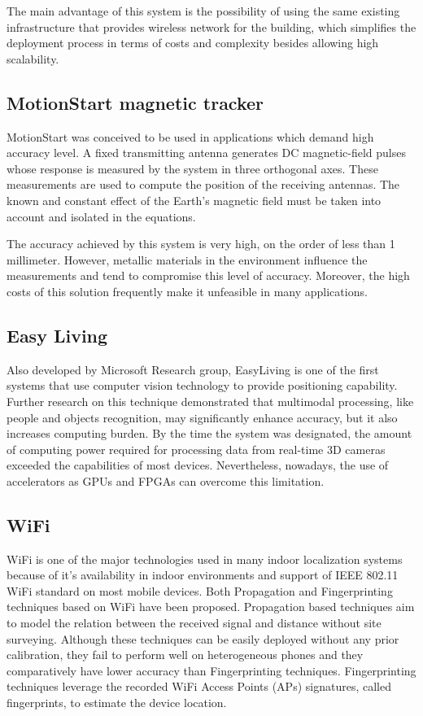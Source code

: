 The main advantage of this system is the possibility of using the same existing infrastructure that provides wireless network for the building, which simplifies the deployment process in terms of costs and complexity besides allowing high scalability.

\subsection{MotionStart magnetic tracker}
MotionStart \cite{motionStart} was conceived to be used in applications which demand high accuracy level. A fixed transmitting antenna generates DC magnetic-field pulses whose response is measured by the system in three orthogonal axes. These measurements are used to compute the position of the receiving antennas. The known and constant effect of the Earth's magnetic field must be taken into account and isolated in the equations.

The accuracy achieved by this system is very high, on the order of less than 1 millimeter. However, metallic materials in the environment influence the measurements and tend to compromise this level of accuracy. Moreover, the high costs of this solution frequently make it unfeasible in many applications.

\subsection{Easy Living}
Also developed by Microsoft Research group, EasyLiving \cite{easyLiving} is one of the first systems that use computer vision technology to provide positioning capability. Further research on this technique demonstrated that multimodal processing, like people and objects recognition, may significantly enhance accuracy, but it also increases computing burden. By the time the system was designated, the amount of computing power required for processing data from real-time 3D cameras exceeded the capabilities of most devices. Nevertheless, nowadays, the use of accelerators as GPUs and FPGAs can overcome this limitation.

\subsection{WiFi} 
WiFi is one of the major technologies used in many indoor localization systems because of it's availability in indoor environments and support of IEEE 802.11 WiFi standard on most mobile devices. Both Propagation and Fingerprinting techniques based on WiFi have been proposed. Propagation based techniques aim to model the relation between the received signal and distance without site surveying. Although these techniques can be easily deployed without any prior calibration, they fail to perform well on heterogeneous phones and they comparatively have lower accuracy than Fingerprinting techniques. Fingerprinting techniques leverage the recorded WiFi Access Points (APs) signatures, called fingerprints, to estimate the device location. 

